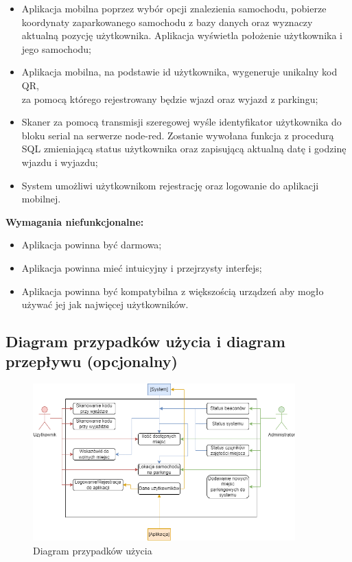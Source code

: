 \documentclass[12pt,a4paper]{article}
\begin{document}
\begin{itemize}
\item Aplikacja mobilna poprzez wybór opcji znalezienia samochodu, pobierze koordynaty zaparkowanego samochodu z bazy danych oraz wyznaczy aktualną pozycję użytkownika. Aplikacja wyświetla położenie użytkownika i jego samochodu;
\item Aplikacja mobilna, na podstawie id użytkownika, wygeneruje unikalny kod QR,\\za pomocą którego rejestrowany będzie wjazd oraz wyjazd z parkingu;
\item Skaner za pomocą transmisji szeregowej wyśle identyfikator użytkownika do bloku serial na serwerze node-red. Zostanie wywołana funkcja z procedurą SQL zmieniającą status użytkownika oraz zapisującą aktualną datę i godzinę wjazdu i wyjazdu;
\item System umożliwi użytkownikom rejestrację oraz logowanie do aplikacji mobilnej.
\end{itemize}
{\large \bf Wymagania niefunkcjonalne:}
\begin{itemize}
\item Aplikacja powinna być darmowa;
\item Aplikacja powinna mieć intuicyjny i przejrzysty interfejs;
\item Aplikacja powinna być kompatybilna z większością urządzeń aby mogło używać jej jak najwięcej użytkowników.
\end{itemize}



\newpage

\subsection{Diagram przypadków użycia i diagram przepływu (opcjonalny)}
\begin{figure}[htb!p]
\begin{center}
\includegraphics[width=0.9\textwidth]{Untitled_Diagram.drawio_1.png}
\caption{Diagram przypadków użycia}
\end{center}
\end{figure}
\end{document}
